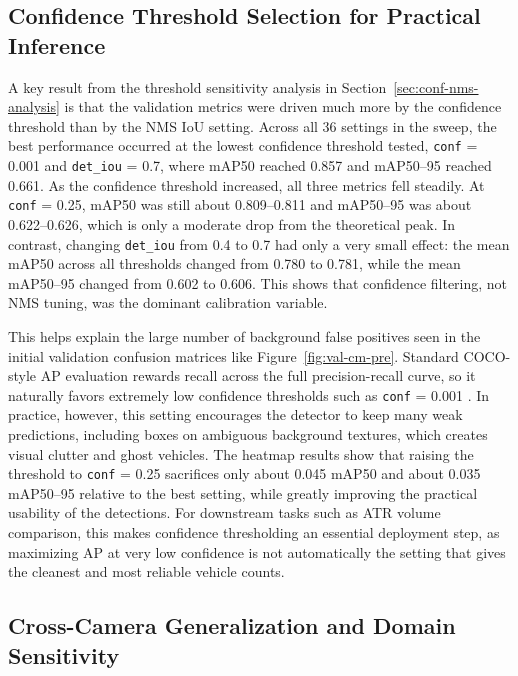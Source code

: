 
\subsection{Confidence Threshold Selection for Practical Inference}

A key result from the threshold sensitivity analysis in Section~\ref{sec:conf-nms-analysis}
is that the validation metrics were driven much more by the confidence threshold 
than by the NMS IoU setting. Across all 36 settings in the sweep, the best performance
occurred at the lowest confidence threshold tested, \verb|conf| = 0.001 and 
\verb|det_iou| = 0.7, where mAP50 reached 0.857 and mAP50--95 reached 0.661. As the 
confidence threshold increased, all three metrics fell steadily. At \verb|conf| = 0.25,
mAP50 was still about 0.809--0.811 and mAP50--95 was about 0.622--0.626, which is only 
a moderate drop from the theoretical peak. In contrast, changing \verb|det_iou| 
from 0.4 to 0.7 had only a very small effect: the mean mAP50 across all thresholds
changed from 0.780 to 0.781, while the mean mAP50--95 changed from 0.602 to 0.606. 
This shows that confidence filtering, not NMS tuning, was the dominant calibration 
variable.

This helps explain the large number of background false positives seen in the 
initial validation confusion matrices like Figure~\ref{fig:val-cm-pre}. 
Standard COCO-style AP evaluation rewards recall across the full precision-recall 
curve, so it naturally favors extremely low confidence thresholds such as 
\verb|conf| = 0.001 \cite{ultralytics_validation}. In practice, however, this setting
encourages the detector to keep many weak predictions, including boxes on ambiguous
background textures, which creates visual clutter and ghost vehicles. The heatmap 
results show that raising the threshold to \verb|conf| = 0.25 sacrifices only 
about 0.045 mAP50 and about 0.035 mAP50--95 relative to the best setting, while greatly 
improving the practical usability of the detections. For downstream tasks such as 
ATR volume comparison, this makes confidence thresholding an essential deployment 
step, as maximizing AP at very low confidence is not automatically the setting 
that gives the cleanest and most reliable vehicle counts.


\subsection{Cross-Camera Generalization and Domain Sensitivity}

